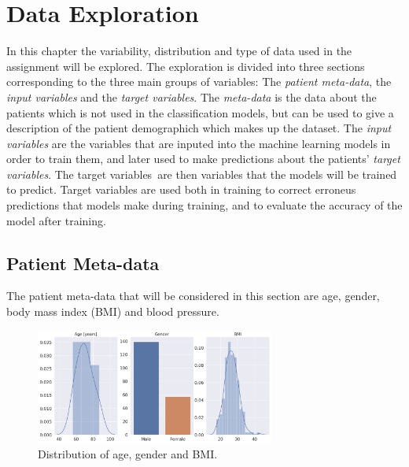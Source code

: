 \chapter{Data Exploration} \label{chap:data}

In this chapter the variability, distribution and type of data used in the assignment will be explored. The exploration is divided into three sections corresponding to the three main groups of variables: The \textit{patient meta-data}, the \textit{input variables} and the \textit{target variables}. The \textit{meta-data} is the data about the patients which is not used in the classification models, but can be used to give a description of the patient demographich which makes up the dataset. The \textit{input variables} are the variables that are inputed into the machine learning models in order to train them, and later used to make predictions about the patients' \textit{target variables}. The target variables are then variables that the models will be trained to predict. Target variables are used both in training to correct erroneus predictions that models make during training, and to evaluate the accuracy of the model after training.   

\section{Patient Meta-data} \label{sec:metadata}
The patient meta-data that will be considered in this section are age, gender, body mass index (BMI) and blood pressure.

\begin{figure}
    \begin{center}
    \includegraphics[width=0.7\textwidth]{data-exp/metadataDist4.png}
    \end{center}
    \caption{Distribution of age, gender and BMI.}
    \label{fig:meta-dist4}
\end{figure}

